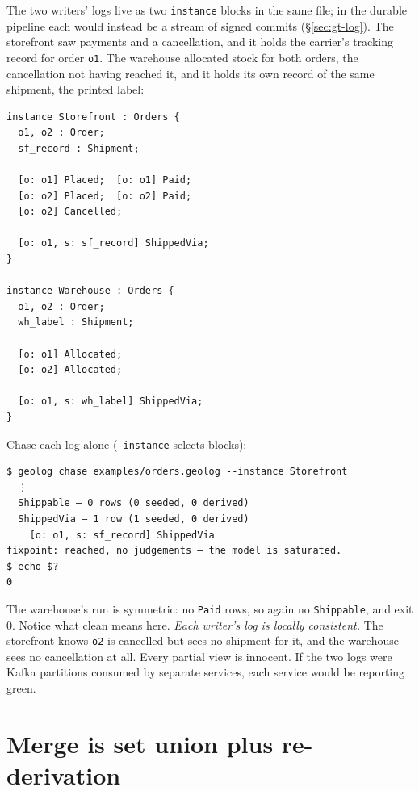 The two writers' logs live as two \texttt{instance} blocks in the
same file; in the durable pipeline each would instead be a stream of
signed commits (\S\ref{sec:gt-log}). The storefront saw payments and a
cancellation, and it holds the carrier's tracking record for order
\texttt{o1}. The warehouse allocated stock for both orders, the
cancellation not having reached it, and it holds its own record of the
same shipment, the printed label:

\begin{Verbatim}[fontsize=\small,frame=leftline,rulecolor=\color{accentmid},framesep=3mm,xleftmargin=3mm]
instance Storefront : Orders {
  o1, o2 : Order;
  sf_record : Shipment;

  [o: o1] Placed;  [o: o1] Paid;
  [o: o2] Placed;  [o: o2] Paid;
  [o: o2] Cancelled;

  [o: o1, s: sf_record] ShippedVia;
}

instance Warehouse : Orders {
  o1, o2 : Order;
  wh_label : Shipment;

  [o: o1] Allocated;
  [o: o2] Allocated;

  [o: o1, s: wh_label] ShippedVia;
}
\end{Verbatim}

Chase each log alone (\texttt{--instance} selects blocks):

\begin{Verbatim}[fontsize=\small,frame=leftline,rulecolor=\color{accentmid},framesep=3mm,xleftmargin=3mm]
$ geolog chase examples/orders.geolog --instance Storefront
  ⋮
  Shippable — 0 rows (0 seeded, 0 derived)
  ShippedVia — 1 row (1 seeded, 0 derived)
    [o: o1, s: sf_record] ShippedVia
fixpoint: reached, no judgements — the model is saturated.
$ echo $?
0
\end{Verbatim}

\noindent The warehouse's run is symmetric: no \texttt{Paid}
rows, so again no \texttt{Shippable}, and exit 0. Notice what clean
means here. \emph{Each writer's log is locally consistent.} The
storefront knows \texttt{o2} is cancelled but sees no shipment for it,
and the warehouse sees no cancellation at all. Every partial view is
innocent. If the two logs were Kafka partitions consumed by separate
services, each service would be reporting green.

\section{Merge is set union plus re-derivation}
\label{sec:gt-merge}

